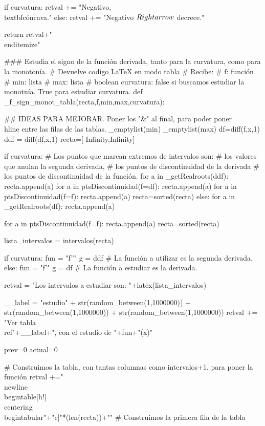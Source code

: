 \begin{sagesilent}
    if curvatura:
        retval += "Negativo, \\textbf{cóncava}."
    else:
        retval += "Negativo $\\Rightarrow$ decrece."


 
 return retval+"\\end{itemize}"

### Estudia el signo de la función derivada, tanto para la curvatura, como para la monotonía.
# Devuelve codigo LaTeX en modo tabla
# Recibe:
# f: función
# min: lista
# max: lista
# boolean curvatura: false si buscamos estudiar la monotnía. True para estudiar curvatura.
def _f_sign_monot_tabla(recta,f,min,max,curvatura):

## IDEAS PARA MEJORAR. Poner los "&" al final, para poder poner \\hline entre las filas de las tablas.
 _emptylist(min)
 _emptylist(max)
 df=diff(f,x,1)
 ddf = diff(df,x,1)
 recta=[-Infinity,Infinity]
 
 
 if curvatura:
    # Los puntos que marcan extremos de intervalos son:
    #       los valores que anulan la segunda derivada, 
    #       los puntos de discontinuidad de la derivada 
    #       los puntos de discontinuidad de la función.
    for a in _getRealroots(ddf):
        recta.append(a)
    for a in ptsDiscontinuidad(f=df):
        recta.append(a)
    for a in ptsDiscontinuidad(f=f):
        recta.append(a)
    recta=sorted(recta) 
 else:
    for a in _getRealroots(df):
        recta.append(a)
    
    for a in ptsDiscontinuidad(f=f):
        recta.append(a)
    recta=sorted(recta) 
    
 lista_intervalos = intervalos(recta)

 if curvatura:
    fun = "f''"
    g = ddf # La función a utilizar es la segunda derivada.
 else:
    fun = "f'"
    g = df # La función a estudiar es la derivada.

 retval = "Los intervalos a estudiar son: "+latex(lista_intervalos)
 

 __label = "estudio" + str(random_between(1,1000000)) + str(random_between(1,1000000)) + str(random_between(1,1000000))
 retval += "Ver tabla \\ref{"+__label+"}, con el estudio de "+fun+"(x)"


 prev=0
 actual=0
 
 # Construimos la tabla, con tantas columnas como intervalos+1, para poner la función
 retval +="\\newline\\begin{table}[h!]\\centering\\begin{tabular}{"+"c|"*(len(recta))+"}"
 # Construimos la primera fila de la tabla
 

\end{sagesilent}

